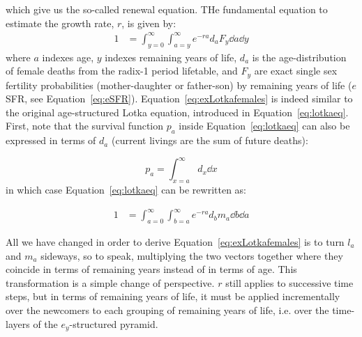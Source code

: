 which give us the so-called renewal equation. THe fundamental equation to
estimate the growth rate, $r$, is given by:
\begin{align}
\label{eq:exLotkafemales}
1 &= \int _{y=0}^\infty \int _{a=y}^\infty e^{-ra} d_{a} F_{y} \dd a \dd y
\end{align}
where $a$ indexes age, $y$ indexes remaining years of life,
$d_{a}$ is the age-distribution of female deaths from the radix-1 period
lifetable, and $F_{y}$ are exact single sex fertility probabilities
(mother-daughter or father-son) by remaining years of
life ($e$SFR, see Equation~\eqref{eq:eSFR}). Equation~\ref{eq:exLotkafemales} is indeed similar to the
original age-structured Lotka equation, introduced in
Equation~\eqref{eq:lotkaeq}. First, note that the survival function $p_a$
inside Equation~\ref{eq:lotkaeq} can also be expressed in terms of
$d_a$ (current livings are the sum of future deaths):

\begin{equation}
p_a = \int _{x = a} ^\infty d_x \dd x
\end{equation}
in which case Equation~\ref{eq:lotkaeq} can be rewritten as:

\begin{align}
\label{eq:lotkadx}
1 &= \int _{a=0}^\infty \int _{b = a}^\infty e^{-ra} d_b m_a \dd b \dd a
\end{align}

All we have changed in order to derive Equation~\ref{eq:exLotkafemales}
is to turn $l_a$ and $m_a$ sideways, so to speak, multiplying the two vectors
together where they coincide in terms of remaining years instead of in terms of age. This
transformation is a simple change of perspective. $r$ still applies to
successive time steps, but in terms of remaining years of life, it must be applied incrementally 
over the newcomers to
each grouping of remaining years of life, i.e. over the time-layers of the
$e_y$-structured pyramid.
